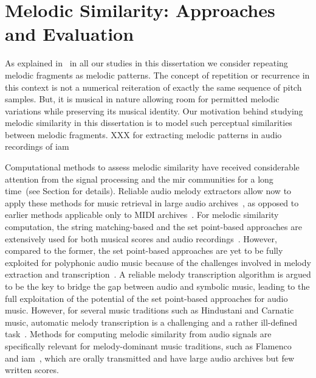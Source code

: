 


\section{Melodic Similarity: Approaches and Evaluation}
\label{sec:patterns_evaluation_of_similarity_measures}

As explained in~ in all our studies in this dissertation we consider repeating melodic fragments as melodic patterns. The concept of repetition or recurrence in this context is not a numerical reiteration of exactly the same sequence of pitch samples. But, it is musical in nature allowing room for permitted melodic variations while preserving its musical identity. Our motivation behind studying melodic similarity in this dissertation is to model such perceptual similarities between melodic fragments. XXX for extracting melodic patterns in audio recordings of \gls{iam}

Computational methods to assess melodic similarity have received considerable attention from the signal processing and the \gls{mir} communities for a long time~\citep{ghias1995query,hewlett1998melodic,casey2008content,typke2007music}(see Section  for details). Reliable audio melody extractors allow now to apply these methods for music retrieval in large audio archives~\citep{ryynanen2008query,zhu2003warping}, as opposed to earlier methods applicable only to MIDI archives~\citep{RBDannenberg2007QBH}. For melodic similarity computation, the string matching-based and the set point-based approaches are extensively used for both musical scores and audio recordings~\cite{typke2007music}. However, compared to the former, the set point-based approaches are yet to be fully exploited for polyphonic audio music because of the challenges involved in melody extraction and transcription~\cite{collins2014bridging}. A reliable melody transcription algorithm is argued to be the key to bridge the gap between audio and symbolic music, leading to the full exploitation of the potential of the set point-based approaches for audio music. However, for several music traditions such as Hindustani and Carnatic music, automatic melody transcription is a challenging and a rather ill-defined task~\cite{Rao2012}. Methods for computing melodic similarity from audio signals are specifically relevant for melody-dominant music traditions, such as Flamenco~\citep{Pikrakis2012} and \gls{iam}~\citep{Rao2014}, which are orally transmitted and have large audio archives but few written scores. 

